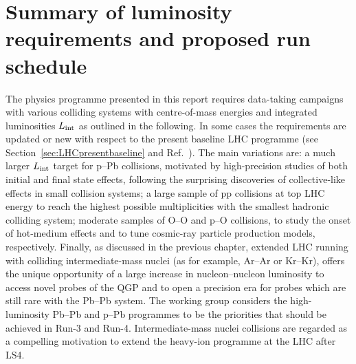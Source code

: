 \documentclass[../report.tex]{subfiles}
\begin{document}
\section{Summary of luminosity requirements and proposed run schedule}
\label{sec:schedule}

The physics programme presented in this report requires data-taking campaigns with various colliding systems with centre-of-mass energies and integrated luminosities $L_{\rm int}$ as outlined in the following. In some cases the requirements are updated or new with respect to the present baseline LHC programme (see Section~\ref{sec:LHCpresentbaseline} and Ref.~\cite{Abelevetal:2014cna}). The main variations are: a much larger $L_{\rm int}$ target for p--Pb collisions, motivated by high-precision studies of both initial and final state effects, following the surprising discoveries of collective-like effects in small collision systems; a large sample of pp collisions at top LHC energy to reach the highest possible multiplicities with the smallest hadronic colliding system; moderate samples of O--O and p--O collisions, to study the onset of hot-medium effects and to tune cosmic-ray particle production models, respectively. Finally, as discussed in the previous chapter, extended LHC running with colliding intermediate-mass nuclei (as for example, Ar--Ar or Kr--Kr), offers the unique opportunity of a large increase in nucleon--nucleon luminosity to access novel probes of the QGP and to open a precision era for probes which are still rare with the Pb--Pb system. The working group considers the high-luminosity Pb--Pb and p--Pb programmes to be the priorities that should be achieved in Run-3 and Run-4. Intermediate-mass nuclei collisions are regarded as a compelling motivation to extend the heavy-ion programme at the LHC after LS4.   
\end{document}
